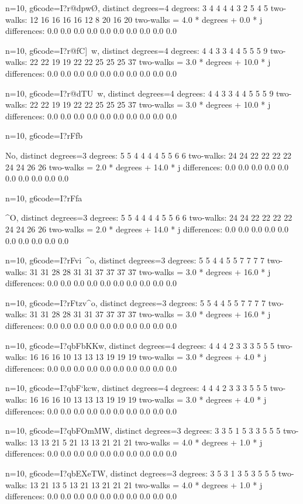 {{{{{{{{{{n=10, g6code=I?r@dpw\O, distinct degrees=4
degrees: 3 4 4 4 4 3 2 5 4 5 
two-walks: 12 16 16 16 16 12 8 20 16 20 
two-walks = 4.0 * degrees + 0.0 * j
differences: 0.0 0.0 0.0 0.0 0.0 0.0 0.0 0.0 0.0 0.0 

n=10, g6code=I?r@fC]~w, distinct degrees=4
degrees: 4 4 3 3 4 4 5 5 5 9 
two-walks: 22 22 19 19 22 22 25 25 25 37 
two-walks = 3.0 * degrees + 10.0 * j
differences: 0.0 0.0 0.0 0.0 0.0 0.0 0.0 0.0 0.0 0.0 

n=10, g6code=I?r@dTU~w, distinct degrees=4
degrees: 4 4 3 3 4 4 5 5 5 9 
two-walks: 22 22 19 19 22 22 25 25 25 37 
two-walks = 3.0 * degrees + 10.0 * j
differences: 0.0 0.0 0.0 0.0 0.0 0.0 0.0 0.0 0.0 0.0 

n=10, g6code=I?rFfb{No, distinct degrees=3
degrees: 5 5 4 4 4 4 5 5 6 6 
two-walks: 24 24 22 22 22 22 24 24 26 26 
two-walks = 2.0 * degrees + 14.0 * j
differences: 0.0 0.0 0.0 0.0 0.0 0.0 0.0 0.0 0.0 0.0 

n=10, g6code=I?rFfa}^O, distinct degrees=3
degrees: 5 5 4 4 4 4 5 5 6 6 
two-walks: 24 24 22 22 22 22 24 24 26 26 
two-walks = 2.0 * degrees + 14.0 * j
differences: 0.0 0.0 0.0 0.0 0.0 0.0 0.0 0.0 0.0 0.0 

n=10, g6code=I?rFvi~^o, distinct degrees=3
degrees: 5 5 4 4 5 5 7 7 7 7 
two-walks: 31 31 28 28 31 31 37 37 37 37 
two-walks = 3.0 * degrees + 16.0 * j
differences: 0.0 0.0 0.0 0.0 0.0 0.0 0.0 0.0 0.0 0.0 

n=10, g6code=I?rFtzv^o, distinct degrees=3
degrees: 5 5 4 4 5 5 7 7 7 7 
two-walks: 31 31 28 28 31 31 37 37 37 37 
two-walks = 3.0 * degrees + 16.0 * j
differences: 0.0 0.0 0.0 0.0 0.0 0.0 0.0 0.0 0.0 0.0 

n=10, g6code=I?qbFbKKw, distinct degrees=4
degrees: 4 4 4 2 3 3 3 5 5 5 
two-walks: 16 16 16 10 13 13 13 19 19 19 
two-walks = 3.0 * degrees + 4.0 * j
differences: 0.0 0.0 0.0 0.0 0.0 0.0 0.0 0.0 0.0 0.0 

n=10, g6code=I?qbF`kcw, distinct degrees=4
degrees: 4 4 4 2 3 3 3 5 5 5 
two-walks: 16 16 16 10 13 13 13 19 19 19 
two-walks = 3.0 * degrees + 4.0 * j
differences: 0.0 0.0 0.0 0.0 0.0 0.0 0.0 0.0 0.0 0.0 

n=10, g6code=I?qbFOmMW, distinct degrees=3
degrees: 3 3 5 1 5 3 3 5 5 5 
two-walks: 13 13 21 5 21 13 13 21 21 21 
two-walks = 4.0 * degrees + 1.0 * j
differences: 0.0 0.0 0.0 0.0 0.0 0.0 0.0 0.0 0.0 0.0 

n=10, g6code=I?qbEXeTW, distinct degrees=3
degrees: 3 5 3 1 3 5 3 5 5 5 
two-walks: 13 21 13 5 13 21 13 21 21 21 
two-walks = 4.0 * degrees + 1.0 * j
differences: 0.0 0.0 0.0 0.0 0.0 0.0 0.0 0.0 0.0 0.0 

}}}}}}}}}}
